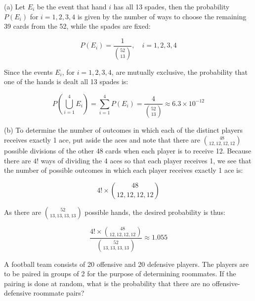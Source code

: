             \begin{solution}
            (a) Let \(E_i\) be the event that hand \(i\) has all 13 spades, then the probability \(P(E_i)\) for \(i = 1, 2, 3, 4\) is given by the number of ways to choose the remaining 39 cards from the 52, while the spades are fixed:
            
            \[
            P(E_i) = \frac{1}{\binom{52}{13}}, \quad i = 1, 2, 3, 4
            \]
            
            Since the events \(E_i\), for \(i = 1, 2, 3, 4\), are mutually exclusive, the probability that one of the hands is dealt all 13 spades is:
            
            \[
            P\left(\bigcup_{i=1}^{4} E_i\right) = \sum_{i=1}^{4} P(E_i) = \frac{4}{\binom{52}{13}} \approx 6.3 \times 10^{-12}
            \]
            
            (b) To determine the number of outcomes in which each of the distinct players receives exactly 1 ace, put aside the aces and note that there are \(\binom{48}{12, 12, 12, 12}\) possible divisions of the other 48 cards when each player is to receive 12. Because there are \(4!\) ways of dividing the 4 aces so that each player receives 1, we see that the number of possible outcomes in which each player receives exactly 1 ace is:
            
            \[
            4! \times \binom{48}{12, 12, 12, 12}
            \]
            
            As there are \(\binom{52}{13, 13, 13, 13}\) possible hands, the desired probability is thus:
            
            \[
            \frac{4! \times \binom{48}{12, 12, 12, 12}}{\binom{52}{13, 13, 13, 13}} \approx 1.055
            \]
            \end{solution}

            \begin{example}
                A football team consists of 20 offensive and 20 defensive players. The players are to be paired in groups of 2 for the purpose of determining roommates. If the pairing is done at random, what is the probability that there are no offensive-defensive roommate pairs?
                \end{example}
                
